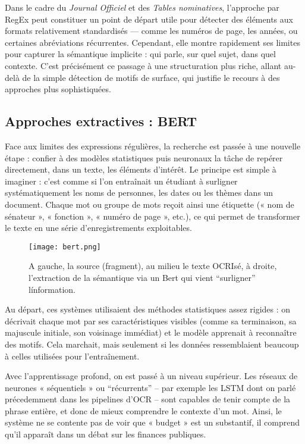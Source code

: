 Dans le cadre du \emph{Journal Officiel} et des \emph{Tables nominatives}, l’approche par RegEx peut constituer un point de départ utile pour détecter des éléments aux formats relativement standardisés — comme les numéros de page, les années, ou certaines abréviations récurrentes. Cependant, elle montre rapidement ses limites pour capturer la sémantique implicite : qui parle, sur quel sujet, dans quel contexte. C’est précisément ce passage à une structuration plus riche, allant au-delà de la simple détection de motifs de surface, qui justifie le recours à des approches plus sophistiquées. 

\subsection{Approches extractives : BERT}

Face aux limites des expressions régulières, la recherche est passée à une nouvelle étape : confier à des modèles statistiques puis neuronaux la tâche de repérer directement, dans un texte, les éléments d’intérêt. Le principe est simple à imaginer : c’est comme si l’on entraînait un étudiant à surligner systématiquement les noms de personnes, les dates ou les thèmes dans un document. Chaque mot ou groupe de mots reçoit ainsi une étiquette (« nom de sénateur », « fonction », « numéro de page », etc.), ce qui permet de transformer le texte en une série d’enregistrements exploitables.

\begin{figure}[htbp]
\centering
\texttt{[image: bert.png]}
\caption{A gauche, la source (fragment), au milieu le texte OCRIsé, à droite, l'extraction de la sémantique via un Bert qui vient \enquote{surligner} l\'information.}
\label{fig:bert}
\end{figure}

Au départ, ces systèmes utilisaient des méthodes statistiques assez rigides : on décrivait chaque mot par ses caractéristiques visibles (comme sa terminaison, sa majuscule initiale, son voisinage immédiat) et le modèle apprenait à reconnaître des motifs. Cela marchait, mais seulement si les données ressemblaient beaucoup à celles utilisées pour l’entraînement.

Avec l’apprentissage profond, on est passé à un niveau supérieur. Les réseaux de neurones « séquentiels » ou \enquote{récurrents} -- par exemple les LSTM dont on parlé précedemment dans les pipelines d'OCR -- sont capables de tenir compte de la phrase entière, et donc de mieux comprendre le contexte d’un mot. Ainsi, le système ne se contente pas de voir que « budget » est un substantif, il comprend qu’il apparaît dans un débat sur les finances publiques.

